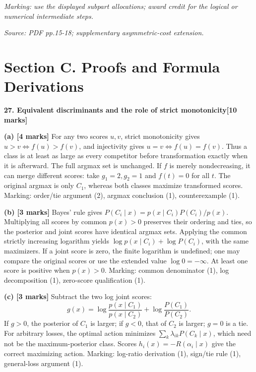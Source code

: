 \documentclass[11pt,a4paper]{article}
\begin{document}
\textit{Marking: use the displayed subpart allocations; award credit for the logical or numerical intermediate steps.}\par
{\footnotesize\textit{Source: PDF pp.15-18; supplementary asymmetric-cost extension.}}
\newpage\section*{Section C. Proofs and Formula Derivations}
\textbf{27. Equivalent discriminants and the role of strict monotonicity}\hfill\textbf{[10 marks]}\par\medskip
\textbf{(a) [4 marks]} For any two scores \(u,v\), strict monotonicity gives \(u>v\iff f(u)>f(v)\), and injectivity gives \(u=v\iff f(u)=f(v)\). Thus a class is at least as large as every competitor before transformation exactly when it is afterward. The full argmax set is unchanged. If \(f\) is merely nondecreasing, it can merge different scores: take \(g_1=2,g_2=1\) and \(f(t)=0\) for all \(t\). The original argmax is only \(C_1\), whereas both classes maximize transformed scores. Marking: order/tie argument (2), argmax conclusion (1), counterexample (1).

\textbf{(b) [3 marks]} Bayes' rule gives \(P(C_i\mid x)=p(x\mid C_i)P(C_i)/p(x)\). Multiplying all scores by common \(p(x)>0\) preserves their ordering and ties, so the posterior and joint scores have identical argmax sets. Applying the common strictly increasing logarithm yields \(\log p(x\mid C_i)+\log P(C_i)\), with the same maximizers. If a joint score is zero, the finite logarithm is undefined; one may compare the original scores or use the extended value \(\log0=-\infty\). At least one score is positive when \(p(x)>0\). Marking: common denominator (1), log decomposition (1), zero-score qualification (1).

\textbf{(c) [3 marks]} Subtract the two log joint scores:
\[
g(x)=\log\frac{p(x\mid C_1)}{p(x\mid C_2)}
+\log\frac{P(C_1)}{P(C_2)}.
\]
If \(g>0\), the posterior of \(C_1\) is larger; if \(g<0\), that of \(C_2\) is larger; \(g=0\) is a tie. For arbitrary losses, the optimal action minimizes \(\sum_k\lambda_{ik}P(C_k\mid x)\), which need not be the maximum-posterior class. Scores \(h_i(x)=-R(\alpha_i\mid x)\) give the correct maximizing action. Marking: log-ratio derivation (1), sign/tie rule (1), general-loss argument (1).
\end{document}
